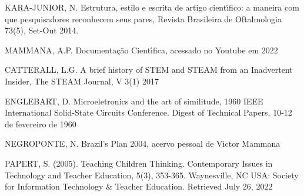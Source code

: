 \documentclass[
12pt,		%
openright,	%
twoside,  %
a4paper,			%
chapter=TITLE,		%
english,			%
french,				%
spanish,			%
brazil				%
]{USPSC-classe/USPSC}
\begin{document}
\begin{flushleft}
\begin{flushleft}
 KARA-JUNIOR, N. Estrutura, estilo e escrita de artigo cient\'{\i}fico: a maneira com que pesquisadores reconhecem seus pares, Revista Brasileira de Oftalmologia 73(5), Set-Out 2014.
\end{flushleft}


\end{flushleft}


\begin{flushleft}
\begin{flushleft}
[MAMMANA, 2019] MAMMANA, A.P. Documenta\c{c}\~ao Cient\'{\i}fica, acessado no Youtube em 2022
\end{flushleft}


\end{flushleft}


\begin{flushleft}
\begin{flushleft}
[CATTERALL, 2017] CATTERALL, L.G. A brief history of STEM and STEAM from an Inadvertent Insider, The STEAM Journal, V 3(1) 2017
\end{flushleft}


\end{flushleft}


\begin{flushleft}
\begin{flushleft}
[ENGLEBART, 2017] ENGLEBART, D. Microeletronics and the art of similitude, 1960 IEEE International Solid-State Circuits Conference. Digest of Technical Papers, 10-12 de fevereiro de 1960
\end{flushleft}


\end{flushleft}


\begin{flushleft}
\begin{flushleft}
[NEGROPONTE, 2004] NEGROPONTE, N. Brazil's Plan 2004, acervo pessoal de Victor Mammana
\end{flushleft}


\end{flushleft}


\begin{flushleft}
\begin{flushleft}
[PAPERT, 2005] PAPERT, S. (2005). Teaching Children Thinking. Contemporary Issues in Technology and Teacher Education, 5(3), 353-365. Waynesville, NC USA: Society for Information Technology \& Teacher Education. Retrieved July 26, 2022
\end{flushleft}


\end{flushleft}
\end{document}
